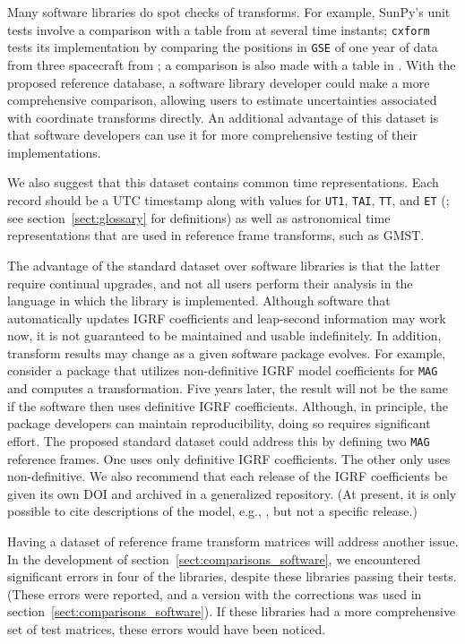 \documentclass[draft]{agujournal2019}
\begin{document}
Many software libraries do spot checks of transforms. For example, SunPy's unit tests \cite{SunPy} involve a comparison with a table from  at several time instants; \texttt{cxform} \cite{cxform} tests its implementation by comparing the positions in \texttt{GSE} of one year of data from three spacecraft from ; a comparison is also made with a table in . With the proposed reference database, a software library developer could make a more comprehensive comparison, allowing users to estimate uncertainties associated with coordinate transforms directly. An additional advantage of this dataset is that software developers can use it for more comprehensive testing of their implementations.

We also suggest that this dataset contains common time representations. Each record should be a UTC timestamp along with values for \texttt{UT1}, \texttt{TAI}, \texttt{TT}, and \texttt{ET} (; see section~\ref{sect:glossary} for definitions) as well as astronomical time representations that are used in reference frame transforms, such as GMST.

The advantage of the standard dataset over software libraries is that the latter require continual upgrades, and not all users perform their analysis in the language in which the library is implemented. Although software that automatically updates IGRF coefficients and leap-second information may work now, it is not guaranteed to be maintained and usable indefinitely. In addition, transform results may change as a given software package evolves. For example, consider a package that utilizes non-definitive IGRF model coefficients for \texttt{MAG} and computes a transformation. Five years later, the result will not be the same if the software then uses definitive IGRF coefficients. Although, in principle, the package developers can maintain reproducibility, doing so requires significant effort. The proposed standard dataset could address this by defining two \texttt{MAG} reference frames. One uses only definitive IGRF coefficients. The other only uses non-definitive. We also recommend that each release of the IGRF coefficients be given its own DOI and archived in a generalized repository. (At present, it is only possible to cite descriptions of the model, e.g., , but not a specific release.)

Having a dataset of reference frame transform matrices will address another issue. In the development of section~\ref{sect:comparisons_software}, we encountered significant errors in four of the libraries, despite these libraries passing their tests. (These errors were reported, and a version with the corrections was used in section~\ref{sect:comparisons_software}). If these libraries had a more comprehensive set of test matrices, these errors would have been noticed.
\end{document}
